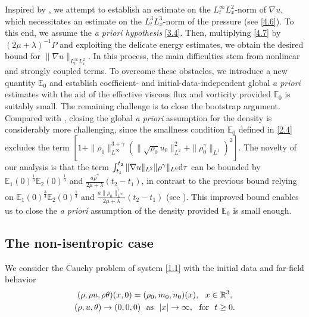 \documentclass[11pt]{article}
\newcommand{\na}{\nabla}
\begin{document}
Inspired by \cite{W2025,LX2019}, we attempt to establish an estimate on the $L^{\infty}_t L^2_x$-norm of $\na u$, which necessitates an estimate on the $L^3_t L^3_x$-norm of the pressure (see \eqref{4.6}). To this end, we assume the {\it a priori hypothesis} \eqref{3.4}. Then, multiplying \eqref{4.7} by $\left( 2 \mu + \lambda\right)^{-1} P$ and exploiting the delicate energy estimates, we obtain the desired bound for $\|\na u\|_{L^{\infty}_t L^2_x}$.
In this process, the main difficulties stem from nonlinear and strongly coupled terms.
To overcome these obstacles, we introduce a new quantity $\mathbb{E}_0$ and establish coefficient- and initial-data-independent global {\it a priori} estimates with the aid of the effective viscous flux and vorticity provided $\mathbb{E}_0$ is suitably small.
The remaining challenge is to close the bootstrap argument. Compared with \cite{W2025}, closing the global {\it a priori} assumption for the density is considerably more challenging, since the smallness condition $\mathbb{E}_0$ defined in \eqref{2.4} excludes the term
$
\left[1 + \|\rho_0\|_{L^{\infty }}^{3 + \gamma} \left( \|\sqrt{\rho_0} u_0\|_{L^2}^2 + \|\rho_0^{\gamma}\|_{L^1} \right)^2 \right].
$
The novelty of our analysis is that the term
$
\int^{t_2}_{t_1} \|\na u\|_{L^2} \|\rho^{\gamma}\|_{L^6} {\rm d} \tau
$
can be bounded by $\mathbb{E}_1 (0)^{\frac{1}{3}} \mathbb{E}_2 (0)^{\frac{1}{3}}$ and $\frac{a \bar{\rho}^{\gamma}}{2 \mu + \lambda } \left( t_2 - t_1 \right)$, in contrast to the previous bound relying on $\mathbb{E}_1 (0)^{\frac{3}{4}} \mathbb{E}_2 (0)^{\frac{1}{4}}$ and $\frac{a \|\rho_0\|_{L^{\infty}}^{\gamma}}{2 \mu + \lambda } \left( t_2 - t_1 \right)$ (see \cite[Lemma 2.9]{W2025}).
This improved bound enables us to close the {\it a priori} assumption of the density provided $\mathbb{E}_0$ is small enough.

\subsection{The non-isentropic case}

We consider the Cauchy problem of system \eqref{1.1} with the initial data and far-field behavior
\begin{gather}\label{2.8}
(\rho,\rho u,\rho\theta )(x,0)=(\rho_0,m_0, n_0)(x), \ \  x\in \mathbb{R}^3,
\\ \label{2.9}
(\rho,u,\theta )\to(0,0,0) \ \ {\rm as} \ \  |x|\to\infty,  \ \  {\rm for}\ \ t\geq 0.
\end{gather}
\end{document}
